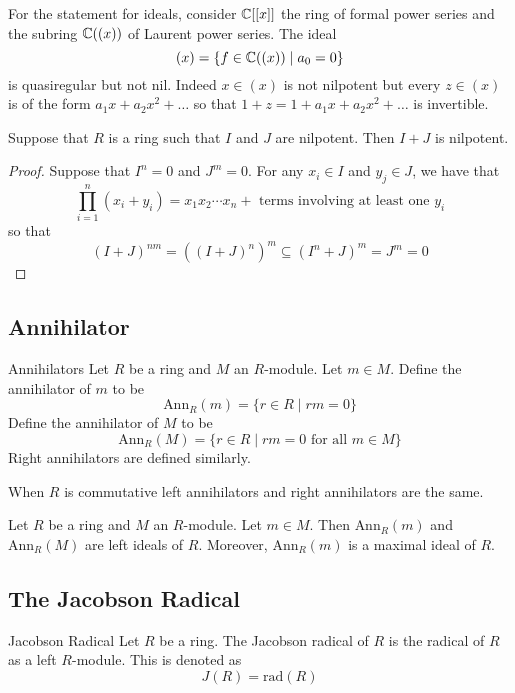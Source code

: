 \documentclass[a4paper]{article}
\begin{document}
For the statement for ideals, consider $\mathbb{C}[[x]]$ the ring of formal power series and the subring $\mathbb{C}((x))$ of Laurent power series. The ideal $$(x)=\{f\in\mathbb{C}((x))\;|\;a_0=0\}$$ is quasiregular but not nil. Indeed $x\in(x)$ is not nilpotent but every $z\in(x)$ is of the form $a_1x+a_2x^2+\dots$ so that $1+z=1+a_1x+a_2x^2+\dots$ is invertible. 

\begin{prp}{}{} Suppose that $R$ is a ring such that $I$ and $J$ are nilpotent. Then $I+J$ is nilpotent. \tcbline
\begin{proof}
Suppose that $I^n=0$ and $J^m=0$. For any $x_i\in I$ and $y_j\in J$, we have that $$\prod_{i=1}^n(x_i+y_i)=x_1x_2\cdots x_n+\text{ terms involving at least one }y_i$$ so that $$(I+J)^{nm}=((I+J)^n)^m\subseteq(I^n+J)^m=J^m=0$$
\end{proof}
\end{prp}

\subsection{Annihilator}
\begin{defn}{Annihilators}{} Let $R$ be a ring and $M$ an $R$-module. Let $m\in M$. Define the annihilator of $m$ to be $$\text{Ann}_R(m)=\{r\in R\;|\;rm=0\}$$ Define the annihilator of $M$ to be $$\text{Ann}_R(M)=\{r\in R\;|\;rm=0\text{ for all }m\in M\}$$ Right annihilators are defined similarly. 
\end{defn}

When $R$ is commutative left annihilators and right annihilators are the same. 

\begin{lmm}{}{} Let $R$ be a ring and $M$ an $R$-module. Let $m\in M$. Then $\text{Ann}_R(m)$ and $\text{Ann}_R(M)$ are left ideals of $R$. Moreover, $\text{Ann}_R(m)$ is a maximal ideal of $R$. 
\end{lmm}

\subsection{The Jacobson Radical}
\begin{defn}{Jacobson Radical}{} Let $R$ be a ring. The Jacobson radical of $R$ is the radical of $R$ as a left $R$-module. This is denoted as $$J(R)=\text{rad}(R)$$
\end{defn}
\end{document}
